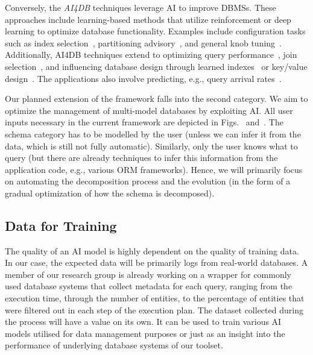 Conversely, the \textit{AI4DB} techniques leverage AI to improve DBMSs. These approaches include learning-based methods that utilize reinforcement or deep learning to optimize database functionality. Examples include configuration tasks such as index selection~\citep{IndexSurvey20}, partitioning advisory~\citep{DBLP:conf/sigmod/HilprechtBR20}, and general knob tuning~\citep{DBLP:journals/vldb/ZhangZLLXCX21}. Additionally, AI4DB techniques extend to optimizing query performance~\citep{DBLP:journals/pvldb/SunL19}, join selection~\citep{DBLP:conf/sigmod/MarcusP18}, and influencing database design through learned indexes~\citep{DBLP:conf/sigmod/DingMYWDLZCGKLK20} or key/value design~\citep{DBLP:conf/cidr/IdreosDQAHRLJGL19}. The applications also involve predicting, e.g., query arrival rates~\citep{DBLP:conf/sigmod/MaAHMPG18}.

Our planned extension of the framework falls into the second category. We aim to optimize the management of multi-model databases by exploiting AI.
All user inputs necessary in the current framework are depicted in Figs.~ and~. The schema category has to be modelled by the user (unless we can infer it from the data, which is still not fully automatic). Similarly, only the user knows what to query (but there are already techniques to infer this information from the application code, e.g., various ORM frameworks). Hence, we will primarily focus on automating the decomposition process and the evolution (in the form of a gradual optimization of how the schema is decomposed).

\subsection{Data for Training}
The quality of an AI model is highly dependent on the quality of training data. In our case, the expected data will be primarily logs from real-world databases. A member of our research group is already working on a wrapper for commonly used database systems that collect metadata for each query, ranging from the execution time, through the number of entities, to the percentage of entities that were filtered out in each step of the execution plan.
The dataset collected during the process will have a value on its own. It can be used to train various AI models utilised for data management purposes or just as an insight into the performance of underlying database systems of our toolset.

